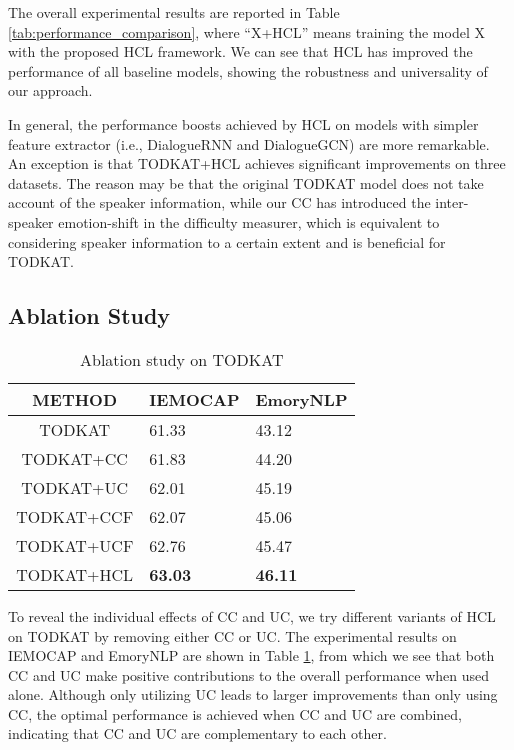 \documentclass[letterpaper]{article} \usepackage{aaai22}  \usepackage{times}  \usepackage{helvet}  \usepackage{courier}  \usepackage[hyphens]{url}  \usepackage{graphicx} \urlstyle{rm} \def\UrlFont{\rm}  \usepackage{natbib}  \usepackage{caption} \DeclareCaptionStyle{ruled}{labelfont=normalfont,labelsep=colon,strut=off} \frenchspacing  \setlength{\pdfpagewidth}{8.5in}  \setlength{\pdfpageheight}{11in}
\begin{document}
The overall experimental results are reported in Table \ref{tab:performance_comparison}, where ``X+HCL'' means training the model X with the proposed HCL framework. We can see that HCL has improved the performance of all baseline models, showing the robustness and universality of our approach. 

In general, the performance boosts achieved by HCL on models with simpler feature extractor (i.e., DialogueRNN and DialogueGCN) are more remarkable. An exception is that TODKAT+HCL achieves significant improvements on three datasets. The reason may be that the original TODKAT model does not take account of the speaker information, while our CC has introduced the inter-speaker emotion-shift  in the difficulty measurer, which is equivalent to considering speaker information to a certain extent and is beneficial for TODKAT. 


\subsection{Ablation Study}

\begin{table}[h]
	\centering  
	\footnotesize 
	\begin{tabular}{cll} 
		\toprule 
		METHOD&IEMOCAP&EmoryNLP\\ 
		\midrule   
		TODKAT&61.33&43.12\\
		TODKAT+CC&61.83&44.20\\ 
		TODKAT+UC&62.01&45.19\\ 
		\midrule   
		TODKAT+CCF&62.07&45.06\\ 
		TODKAT+UCF&62.76&45.47\\     
		TODKAT+HCL&\bf{63.03}&\bf{46.11}\\ 
		\bottomrule 
	\end{tabular}  
	\caption{ Ablation study on TODKAT} \label{tab:ablation_studies}  
\end{table}




To reveal the individual effects of CC and UC, we try different variants of HCL on TODKAT by removing either CC or UC. The experimental results on IEMOCAP and EmoryNLP are shown in Table \ref{tab:ablation_studies}, from which we see that both CC and UC make positive contributions to the overall performance when used alone. Although only utilizing UC leads to larger improvements than only using CC, the optimal performance is achieved when CC and UC are combined, indicating that CC and UC are complementary to each other. 
\end{document}
